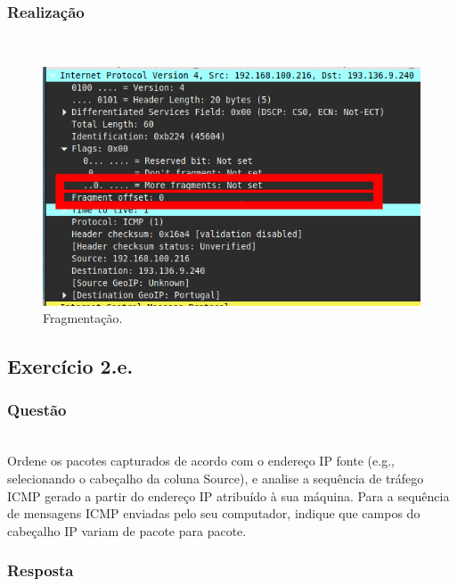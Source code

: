 \documentclass{llncs}
\begin{document}
\subsubsection{Realização}\rule[-10pt]{0pt}{10pt}\\
\begin{figure}
	\begin{center}
	\includegraphics[scale=0.35]{./imagens/icmp_frag.png} 
	\end{center}
	\caption{\label{fig:icmp_frag}Fragmentação.}
\end{figure} 


\subsection{Exercício 2.e.}
\subsubsection{Questão}\rule[-10pt]{0pt}{10pt}\\

Ordene os pacotes capturados de acordo com o endereço IP fonte (e.g., selecionando o cabeçalho da coluna Source), e analise a sequência de tráfego ICMP gerado a partir do endereço IP atribuído à sua máquina. Para a sequência de mensagens ICMP enviadas pelo seu computador, indique que campos do cabeçalho IP variam de pacote para pacote.  

\subsubsection{Resposta}\rule[-10pt]{0pt}{10pt}\\
\end{document}
